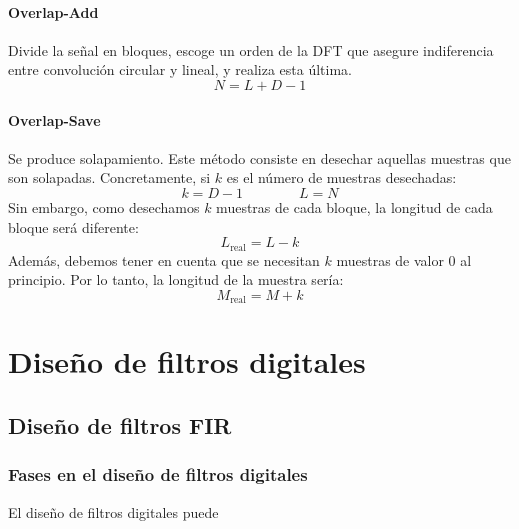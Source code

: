 \documentclass[a4paper,oneside]{book}
\begin{document}
\begin{multicols}{2}
	\subsubsection{Overlap-Add}
	Divide la señal en bloques, escoge un orden de la DFT que asegure indiferencia entre convolución circular y lineal, y realiza esta última.
	\[ N = L + D - 1 \]
	\vspace*{\fill}
	
\columnbreak
	\subsubsection{Overlap-Save}	
	Se produce solapamiento. Este método consiste en desechar aquellas muestras que son solapadas. Concretamente, si $k$ es el número de muestras desechadas:
	\[ k = D - 1 \qquad \qquad L = N \]
	Sin embargo, como desechamos $k$ muestras de cada bloque, la longitud de cada bloque será diferente:
	\[ L_\text{real} = L - k\]
	Además, debemos tener en cuenta que se necesitan $k$ muestras de valor 0 al principio. Por lo tanto, la longitud de la muestra sería:
	\[ M_\text{real} = M + k \]

	\vspace*{\fill}
\end{multicols}


\chapter{Diseño de filtros digitales} \label{temaDeFiltros}

\section{Diseño de filtros FIR}

\subsection{Fases en el diseño de filtros digitales}

El diseño de filtros digitales puede
\end{document}
